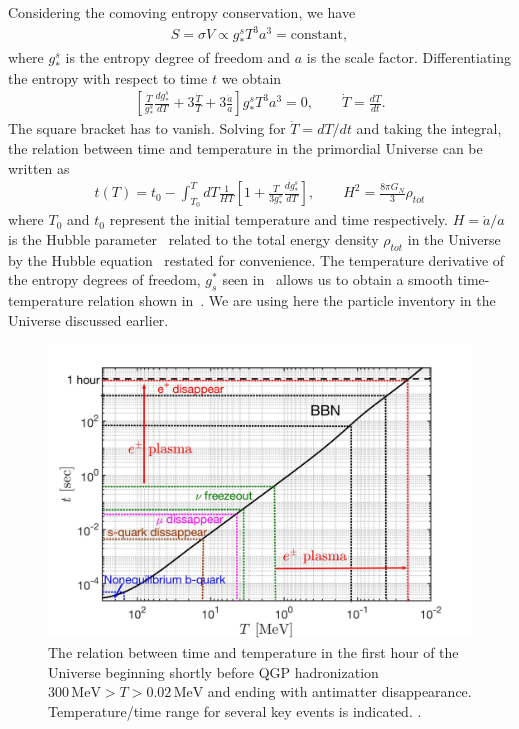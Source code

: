 Considering the comoving entropy conservation, we have
\begin{align}
S=\sigma V\propto g^s_\ast T^3a^3=\mathrm{constant},
\end{align}
where $g^s_\ast$ is the entropy degree of freedom and $a$ is the scale factor. Differentiating the entropy with respect to time $t$ we obtain
\begin{align}
\left[\frac{\dot{T}}{g^s_\ast}\frac{dg^s_\ast}{dT}+3\frac{\dot{T}}{T}+3\frac{\dot{a}}{a}\right]g^s_\ast T^3a^3=0,\qquad \dot{T}=\frac{dT}{dt}.
\end{align}
The square bracket has to vanish. Solving for $\dot T=dT/dt$ and taking the integral, the relation between time and temperature in the primordial Universe can be written as
\begin{align}\label{time}
t(T)=t_0-\int^T_{T_0}dT\frac{1}{HT}\left[1+\frac{T}{3g^s_\ast}\frac{dg^s_\ast}{dT}\right],\qquad H^2=\frac{8\pi G_N}{3}\rho_{tot}
\end{align}
where $T_0$ and $t_0$ represent the initial temperature and time respectively. $H=\dot a/a$ is the Hubble parameter~ related to the total energy density $\rho_{tot}$ in the Universe by the Hubble equation~ restated for convenience. The temperature derivative of the entropy degrees of freedom, $g^\ast_s$ seen in~ allows us to obtain a smooth time-temperature relation shown in~. We are using here the particle inventory in the Universe discussed earlier.

\begin{figure}
\centerline{\includegraphics[width=\textwidth,width=\linewidth]{01-introduction/Figures/CosmicTimeTemperature.jpg}}
 \caption{The relation between time and temperature in the first hour of the Universe beginning shortly before QGP hadronization $300\,\mathrm{MeV}>T>0.02\,\mathrm{MeV} $ and ending with antimatter disappearance. Temperature/time range for several key events is indicated. .}
 \label{Fig:Overview}
\end{figure}


